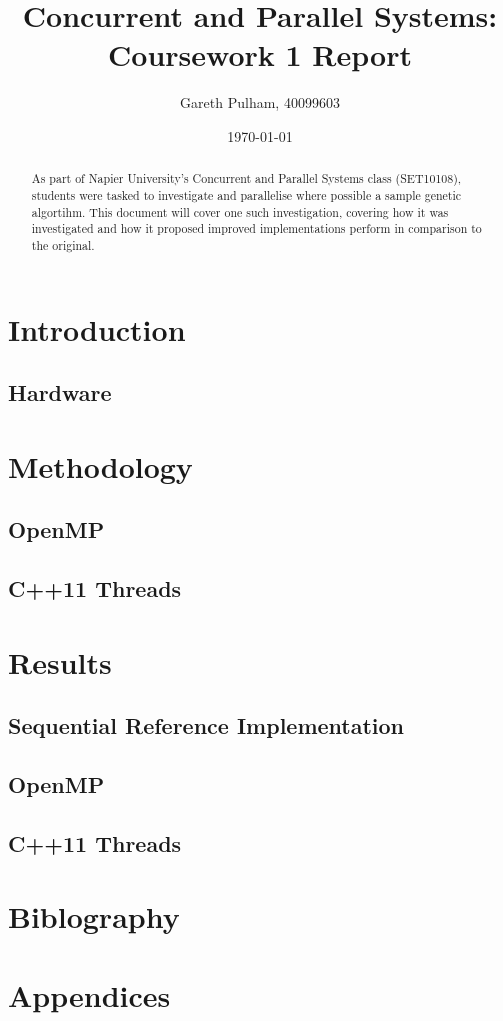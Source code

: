 \documentclass[a4paper]{article}
\begin{document}
    \begin{titlepage}
        \title{Concurrent and Parallel Systems: Coursework 1 Report}
        \author{Gareth Pulham, 40099603}
        \date{\today}
        \maketitle
        \thispagestyle{empty}
        \begin{abstract}
            As part of Napier University's Concurrent and Parallel Systems class (SET10108), students were tasked to
            investigate and parallelise where possible a sample genetic algortihm. This document will cover one such
            investigation, covering how it was investigated and how it proposed improved implementations perform in
            comparison to the original.
        \end{abstract}
    \end{titlepage}

    \tableofcontents

    \section{Introduction}
        \subsection{Hardware}

    \section{Methodology}
        \subsection{OpenMP}
        \subsection{C++11 Threads}

    \section{Results}
        \subsection{Sequential Reference Implementation}
        \subsection{OpenMP}
        \subsection{C++11 Threads}

    \section{Biblography}

    \section{Appendices}
\end{document}
